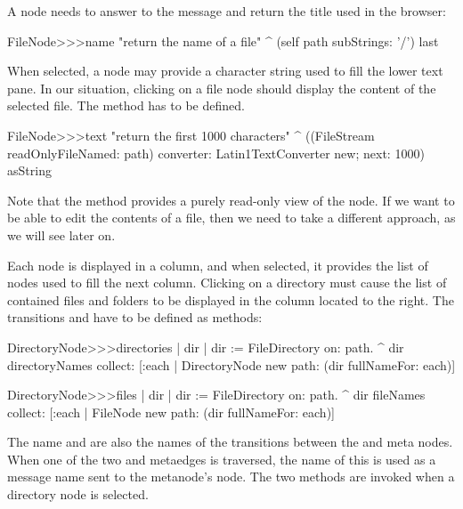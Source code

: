 \documentclass[a4paper,10pt,twoside]{book}
\begin{document}
A node needs to answer to the message  and return the title used in the browser:

\begin{code}{}    
FileNode>>>name
	"return the name of a file"
	^ (self path subStrings: '/') last
\end{code}

When selected, a node may provide a character string used to fill the lower text pane. In our situation, clicking on a file node should display the content of the selected file. The method  has to be defined. 

\begin{code}{}    
FileNode>>>text
	"return the first 1000 characters"
     ^ ((FileStream readOnlyFileNamed: path) converter: Latin1TextConverter new; 
              next: 1000) asString
\end{code}

Note that the method  provides a purely read-only view of the node.
If we want to be able to edit the contents of a file, then we need to take a different approach, as we will see later on.

Each node is displayed in a column, and when selected, it provides the list of nodes used to fill the next column. Clicking on a directory must cause the list of contained files and folders to be displayed in the column located to the right. The transitions  and  have to be defined as methods:

\begin{code}{}    
DirectoryNode>>>directories
     | dir | 
     dir := FileDirectory on: path.
     ^ dir directoryNames collect: [:each | 
                            DirectoryNode new path: (dir fullNameFor: each)]

DirectoryNode>>>files
    | dir | 
     dir := FileDirectory on:  path.
     ^ dir fileNames collect: [:each | 
                            FileNode new path: (dir fullNameFor: each)]
\end{code}

The name  and  are also the names of the transitions between the  and  meta nodes. When one of the two  and  metaedges is traversed, the name of this  is used as a message name sent to the metanode's node. The two methods are invoked when a directory node is selected.
\end{document}
